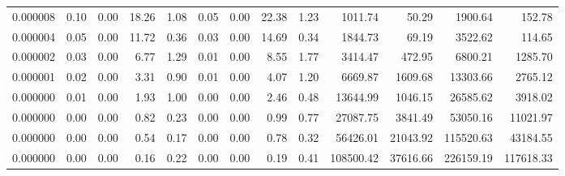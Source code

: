 \begin{tabular}{lrrrrrrrrrrrr}
0.000008 & 0.10 & 0.00 & 18.26 & 1.08 & 0.05 & 0.00 & 22.38 & 1.23 & 1011.74 & 50.29 & 1900.64 & 152.78 \\
0.000004 & 0.05 & 0.00 & 11.72 & 0.36 & 0.03 & 0.00 & 14.69 & 0.34 & 1844.73 & 69.19 & 3522.62 & 114.65 \\
0.000002 & 0.03 & 0.00 & 6.77 & 1.29 & 0.01 & 0.00 & 8.55 & 1.77 & 3414.47 & 472.95 & 6800.21 & 1285.70 \\
0.000001 & 0.02 & 0.00 & 3.31 & 0.90 & 0.01 & 0.00 & 4.07 & 1.20 & 6669.87 & 1609.68 & 13303.66 & 2765.12 \\
0.000000 & 0.01 & 0.00 & 1.93 & 1.00 & 0.00 & 0.00 & 2.46 & 0.48 & 13644.99 & 1046.15 & 26585.62 & 3918.02 \\
0.000000 & 0.00 & 0.00 & 0.82 & 0.23 & 0.00 & 0.00 & 0.99 & 0.77 & 27087.75 & 3841.49 & 53050.16 & 11021.97 \\
0.000000 & 0.00 & 0.00 & 0.54 & 0.17 & 0.00 & 0.00 & 0.78 & 0.32 & 56426.01 & 21043.92 & 115520.63 & 43184.55 \\
0.000000 & 0.00 & 0.00 & 0.16 & 0.22 & 0.00 & 0.00 & 0.19 & 0.41 & 108500.42 & 37616.66 & 226159.19 & 117618.33 \\
\bottomrule
\end{tabular}
